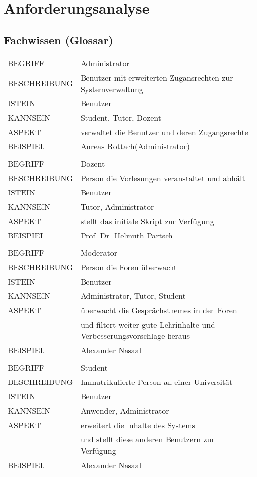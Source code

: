 \documentclass[12pt,a4paper]{article}
\begin{document}
\section{Anforderungsanalyse}
\subsection{Fachwissen (Glossar)}
\begin{tabular}{l p{10cm}}  
BEGRIFF 	 & Administrator \\ 
BESCHREIBUNG & Benutzer mit erweiterten Zugansrechten zur Systemverwaltung\\ 
ISTEIN   	 & Benutzer \\
KANNSEIN 	 & Student, Tutor, Dozent \\ 
ASPEKT   	 & verwaltet die Benutzer und deren Zugangsrechte\\
BEISPIEL 	 & Anreas Rottach(Administrator)\\
\hline 
&\\ 

BEGRIFF 	 & Dozent \\ 
BESCHREIBUNG & Person die Vorlesungen veranstaltet und abhält \\ 
ISTEIN   	 & Benutzer\\
KANNSEIN 	 & Tutor, Administrator \\ 
ASPEKT   	 & stellt das initiale Skript zur Verfügung\\
BEISPIEL 	 & Prof. Dr. Helmuth Partsch\\
\hline

&\\ 

BEGRIFF 	 & Moderator \\ 
BESCHREIBUNG & Person die Foren überwacht\\
ISTEIN   	 & Benutzer \\
KANNSEIN 	 & Administrator, Tutor, Student \\ 
ASPEKT   	 & überwacht die Gesprächsthemes in den Foren \\
 	     	 & und filtert weiter gute Lehrinhalte und Verbesserungsvorschläge heraus\\
BEISPIEL 	 & Alexander Nasaal\\
\hline

&\\ 

BEGRIFF 	 & Student \\ 
BESCHREIBUNG & Immatrikulierte Person an einer Universität \\ 
ISTEIN   	 & Benutzer \\
KANNSEIN 	 & Anwender, Administrator \\ 
ASPEKT   	 & erweitert die Inhalte des Systems\\
 	     	 & und stellt diese anderen Benutzern zur Verfügung \\
BEISPIEL 	 & Alexander Nasaal\\
\hline

\end{tabular}
\end{document}
